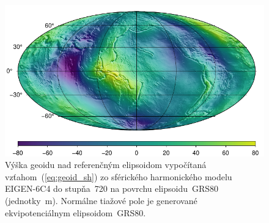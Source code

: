 \documentclass[a4paper, 12pt]{book}
\begin{document}
\begin{figure}
\centering
\includegraphics{./fig-geoid-ggm.pdf}
\caption{Výška geoidu nad referenčným elipsoidom vypočítaná 
vzťahom~(\ref{eq:geoid_sh}) zo sférického harmonického modelu EIGEN-6C4 do 
stupňa~720 na povrchu elipsoidu~GRS80 (jednotky~m).  Normálne tiažové pole je 
generované ekvipotenciálnym elipsoidom~GRS80.}
\label{fig:geoid_ggm}
\end{figure}
\end{document}
